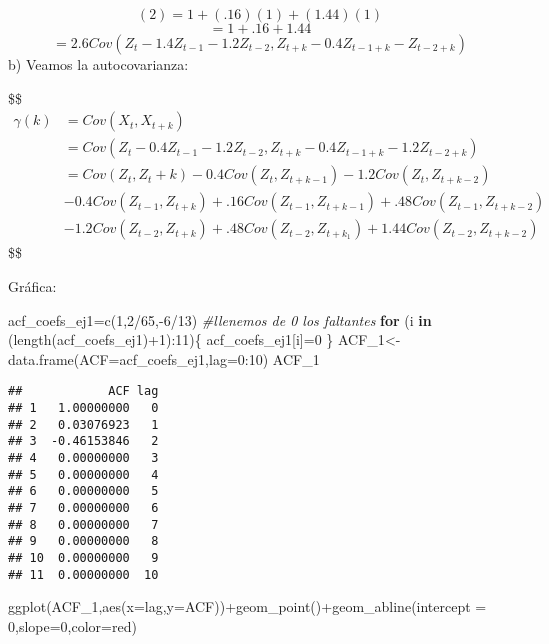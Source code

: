 \documentclass[
]{article}
\newenvironment{Shaded}{\begin{snugshade}}{\end{snugshade}}
\newcommand{\AttributeTok}[1]{\textcolor[rgb]{0.77,0.63,0.00}{#1}}
\newcommand{\CommentTok}[1]{\textcolor[rgb]{0.56,0.35,0.01}{\textit{#1}}}
\newcommand{\ControlFlowTok}[1]{\textcolor[rgb]{0.13,0.29,0.53}{\textbf{#1}}}
\newcommand{\DecValTok}[1]{\textcolor[rgb]{0.00,0.00,0.81}{#1}}
\newcommand{\FunctionTok}[1]{\textcolor[rgb]{0.00,0.00,0.00}{#1}}
\newcommand{\NormalTok}[1]{#1}
\newcommand{\OtherTok}[1]{\textcolor[rgb]{0.56,0.35,0.01}{#1}}
\newcommand{\SpecialCharTok}[1]{\textcolor[rgb]{0.00,0.00,0.00}{#1}}
\newcommand{\StringTok}[1]{\textcolor[rgb]{0.31,0.60,0.02}{#1}}
\begin{document}
\[ (2) = 1 + (.16)(1) + (1.44)(1) \] \[ = 1 + .16 + 1.44 \]
\[ = 2.6  Cov(Z_{t} - 1.4Z_{t-1} - 1.2Z_{t-2}, Z_{t+k} - 0.4Z_{t-1+k} - Z_{t-2+k}) \]
b) Veamos la autocovarianza:

\$\$ \begin{align*}
\gamma(k) &= Cov(X_{t}, X_{t+k})\\
          &= Cov(Z_{t} - 0.4Z_{t-1} - 1.2Z_{t-2}, Z_{t+k} - 0.4Z_{t-1+k} - 1.2Z_{t-2+k})\\
          &= Cov(Z_{t}, Z{_t+k}) - 0.4 Cov(Z_{t}, Z_{t+k-1}) - 1.2 Cov(Z_{t}, Z_{t+k-2})\\
           &-0.4 Cov(Z_{t-1},Z_{t+k}) + .16Cov(Z_{t-1},Z_{t+k-1}) + .48Cov(Z_{t-1}, Z_{t+k-2})\\
           &-1.2Cov(Z_{t-2}, Z_{t+k}) + .48 Cov(Z_{t-2}, Z_{t+k_1}) + 1.44 Cov(Z_{t-2}, Z_{t+k-2})
 
\end{align*} \$\$

Gráfica:

\begin{Shaded}
\begin{Highlighting}[]
\NormalTok{acf\_coefs\_ej1}\OtherTok{=}\FunctionTok{c}\NormalTok{(}\DecValTok{1}\NormalTok{,}\DecValTok{2}\SpecialCharTok{/}\DecValTok{65}\NormalTok{,}\SpecialCharTok{{-}}\DecValTok{6}\SpecialCharTok{/}\DecValTok{13}\NormalTok{)}
\CommentTok{\#llenemos de 0 los faltantes}
\ControlFlowTok{for}\NormalTok{ (i }\ControlFlowTok{in}\NormalTok{ (}\FunctionTok{length}\NormalTok{(acf\_coefs\_ej1)}\SpecialCharTok{+}\DecValTok{1}\NormalTok{)}\SpecialCharTok{:}\DecValTok{11}\NormalTok{)\{}
\NormalTok{  acf\_coefs\_ej1[i]}\OtherTok{=}\DecValTok{0}
\NormalTok{\}}
\NormalTok{ACF\_1}\OtherTok{\textless{}{-}}\FunctionTok{data.frame}\NormalTok{(}\StringTok{\textquotesingle{}ACF\textquotesingle{}}\OtherTok{=}\NormalTok{acf\_coefs\_ej1,}\AttributeTok{lag=}\DecValTok{0}\SpecialCharTok{:}\DecValTok{10}\NormalTok{)}
\NormalTok{ACF\_1}
\end{Highlighting}
\end{Shaded}

\begin{verbatim}
##            ACF lag
## 1   1.00000000   0
## 2   0.03076923   1
## 3  -0.46153846   2
## 4   0.00000000   3
## 5   0.00000000   4
## 6   0.00000000   5
## 7   0.00000000   6
## 8   0.00000000   7
## 9   0.00000000   8
## 10  0.00000000   9
## 11  0.00000000  10
\end{verbatim}

\begin{Shaded}
\begin{Highlighting}[]
\FunctionTok{ggplot}\NormalTok{(ACF\_1,}\FunctionTok{aes}\NormalTok{(}\AttributeTok{x=}\NormalTok{lag,}\AttributeTok{y=}\NormalTok{ACF))}\SpecialCharTok{+}\FunctionTok{geom\_point}\NormalTok{()}\SpecialCharTok{+}\FunctionTok{geom\_abline}\NormalTok{(}\AttributeTok{intercept =} \DecValTok{0}\NormalTok{,}\AttributeTok{slope=}\DecValTok{0}\NormalTok{,}\AttributeTok{color=}\StringTok{\textquotesingle{}red\textquotesingle{}}\NormalTok{)}
\end{Highlighting}
\end{Shaded}
\end{document}
